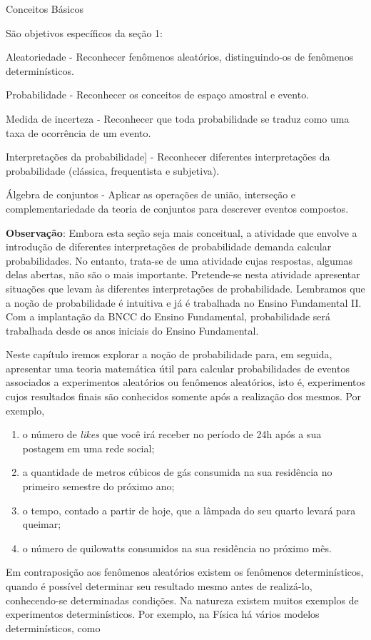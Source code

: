 \begin{paginatexto}{Conceitos Básicos}
{  São objetivos específicos da seção 1:

  \begin{OES}
  \item Aleatoriedade - Reconhecer fenômenos aleatórios, distinguindo-os de fenômenos determinísticos.
  \item Probabilidade - Reconhecer os conceitos de espaço amostral e evento.
  \item Medida de incerteza - Reconhecer que toda probabilidade se traduz como uma taxa de ocorrência de um evento.
  \item Interpretações da probabilidade] - Reconhecer diferentes interpretações da probabilidade (clássica, frequentista e subjetiva).
  \item Álgebra de conjuntos - Aplicar as operações de união, interseção e complementariedade da teoria de conjuntos para descrever eventos compostos.
  \end{OES}

  \textbf{Observação}: Embora esta seção seja mais conceitual, a atividade que envolve a introdução de diferentes interpretações de probabilidade demanda calcular probabilidades. No entanto, trata-se de uma atividade cujas respostas, algumas delas abertas, não são o mais importante. Pretende-se nesta atividade apresentar situações que levam às diferentes interpretações de probabilidade. Lembramos que a noção de probabilidade é intuitiva e já é trabalhada no Ensino Fundamental II. Com a implantação da BNCC do Ensino Fundamental, probabilidade será trabalhada desde os anos iniciais do Ensino Fundamental.
}
\end{paginatexto}
\label{conceitosbasicos}
Neste capítulo iremos explorar a noção de probabilidade para, em seguida, apresentar uma teoria matemática útil para calcular probabilidades de eventos associados a experimentos aleatórios ou fenômenos aleatórios, isto é, experimentos cujos resultados finais são conhecidos somente após a realização dos mesmos. Por exemplo,

\begin{enumerate}
\item {} 
o número de \textit{likes} que você irá receber no período de 24h após a sua postagem em uma rede social;

\item {} 
a quantidade de metros cúbicos de gás consumida na sua residência no primeiro semestre do próximo ano;

\item {} 
o tempo, contado a partir de hoje, que a lâmpada do seu quarto levará para queimar;

\item {} 
o número de quilowatts consumidos na sua residência no próximo mês.
\end{enumerate}
Em contraposição aos fenômenos aleatórios existem os fenômenos determinísticos, quando é possível determinar seu resultado mesmo antes de realizá-lo, conhecendo-se determinadas condições. Na natureza existem muitos exemplos de experimentos determinísticos. Por exemplo, na Física há vários modelos determinísticos, como

